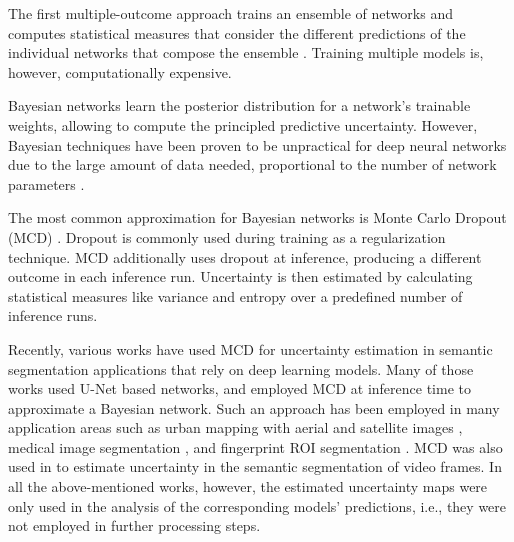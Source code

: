 The first multiple-outcome approach trains an ensemble of networks and computes statistical measures that consider the different predictions of the individual networks that compose the ensemble \cite{lakshminarayanan2017simple, mehrtash2020confidence}. Training multiple models is, however, computationally expensive. 

Bayesian networks learn the posterior distribution for a network's trainable weights, allowing to compute the principled predictive uncertainty. However, Bayesian techniques have been proven to be unpractical for deep neural networks due to the large amount of data needed, proportional to the number of network parameters \cite{gawlikowski2021survey}. 

The most common approximation for Bayesian networks is Monte Carlo Dropout (MCD) \cite{gal2016dropout}. Dropout is commonly used during training as a regularization technique. MCD additionally uses dropout at inference, producing a different outcome in each inference run. Uncertainty is then estimated by calculating statistical measures like variance and entropy over a predefined number of inference runs.

Recently, various works have used MCD for uncertainty estimation in semantic segmentation applications that rely on deep learning models. Many of those works used U-Net \cite{ronneberger2015u} based networks, and employed MCD at inference time to approximate a Bayesian network. Such an approach has been employed in many application areas such as urban mapping with aerial and satellite images \cite{dechesne2021bayesian}, medical image segmentation \cite{nguyen2021comparison, kwon2020uncertainty}, and fingerprint ROI segmentation \cite{joshi2021explainable}. MCD was also used in \cite{huang2018efficient} to estimate uncertainty in the semantic segmentation of video frames. In all the above-mentioned works, however, the estimated uncertainty maps were only used in the analysis of the corresponding models' predictions, i.e., they were not employed in further processing steps.%

